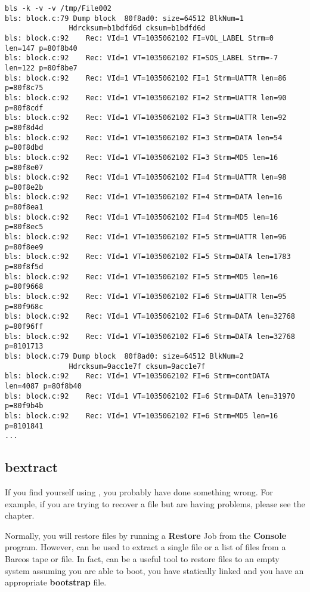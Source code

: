 \footnotesize
\begin{verbatim}
bls -k -v -v /tmp/File002
bls: block.c:79 Dump block  80f8ad0: size=64512 BlkNum=1
               Hdrcksum=b1bdfd6d cksum=b1bdfd6d
bls: block.c:92    Rec: VId=1 VT=1035062102 FI=VOL_LABEL Strm=0 len=147 p=80f8b40
bls: block.c:92    Rec: VId=1 VT=1035062102 FI=SOS_LABEL Strm=-7 len=122 p=80f8be7
bls: block.c:92    Rec: VId=1 VT=1035062102 FI=1 Strm=UATTR len=86 p=80f8c75
bls: block.c:92    Rec: VId=1 VT=1035062102 FI=2 Strm=UATTR len=90 p=80f8cdf
bls: block.c:92    Rec: VId=1 VT=1035062102 FI=3 Strm=UATTR len=92 p=80f8d4d
bls: block.c:92    Rec: VId=1 VT=1035062102 FI=3 Strm=DATA len=54 p=80f8dbd
bls: block.c:92    Rec: VId=1 VT=1035062102 FI=3 Strm=MD5 len=16 p=80f8e07
bls: block.c:92    Rec: VId=1 VT=1035062102 FI=4 Strm=UATTR len=98 p=80f8e2b
bls: block.c:92    Rec: VId=1 VT=1035062102 FI=4 Strm=DATA len=16 p=80f8ea1
bls: block.c:92    Rec: VId=1 VT=1035062102 FI=4 Strm=MD5 len=16 p=80f8ec5
bls: block.c:92    Rec: VId=1 VT=1035062102 FI=5 Strm=UATTR len=96 p=80f8ee9
bls: block.c:92    Rec: VId=1 VT=1035062102 FI=5 Strm=DATA len=1783 p=80f8f5d
bls: block.c:92    Rec: VId=1 VT=1035062102 FI=5 Strm=MD5 len=16 p=80f9668
bls: block.c:92    Rec: VId=1 VT=1035062102 FI=6 Strm=UATTR len=95 p=80f968c
bls: block.c:92    Rec: VId=1 VT=1035062102 FI=6 Strm=DATA len=32768 p=80f96ff
bls: block.c:92    Rec: VId=1 VT=1035062102 FI=6 Strm=DATA len=32768 p=8101713
bls: block.c:79 Dump block  80f8ad0: size=64512 BlkNum=2
               Hdrcksum=9acc1e7f cksum=9acc1e7f
bls: block.c:92    Rec: VId=1 VT=1035062102 FI=6 Strm=contDATA len=4087 p=80f8b40
bls: block.c:92    Rec: VId=1 VT=1035062102 FI=6 Strm=DATA len=31970 p=80f9b4b
bls: block.c:92    Rec: VId=1 VT=1035062102 FI=6 Strm=MD5 len=16 p=8101841
...
\end{verbatim}
\normalsize

\subsection{bextract}
\label{bextract}


If you find yourself using , you probably have done
something wrong. For example, if you are trying to recover a file
but are having problems, please see the  chapter.

Normally, you will restore files by running a {\bf Restore} Job from the {\bf
Console} program. However,  can be used to extract a single file
or a list of files from a Bareos tape or file. In fact,  can be
a useful tool to restore files to an empty system assuming you are able to
boot, you have statically linked  and you have an appropriate
{\bf bootstrap} file.

